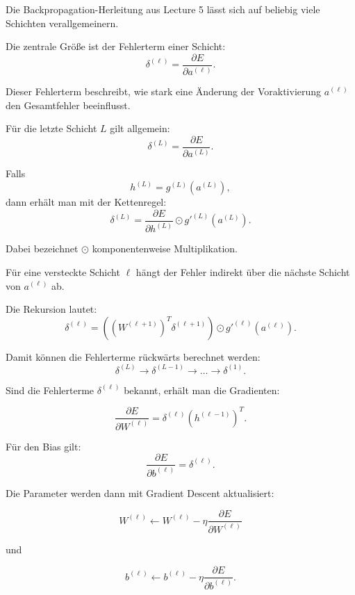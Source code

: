 \documentclass[11pt,a4paper]{scrartcl}
\begin{document}
\begin{notebox}
    Die Backpropagation-Herleitung aus Lecture 5 lässt sich auf beliebig viele
    Schichten verallgemeinern.

    Die zentrale Größe ist der Fehlerterm einer Schicht:
    \[
        \delta^{(\ell)}
        =
        \frac{\partial E}{\partial a^{(\ell)}}.
    \]

    Dieser Fehlerterm beschreibt, wie stark eine Änderung der Voraktivierung
    \(a^{(\ell)}\) den Gesamtfehler beeinflusst.
\end{notebox}

\begin{calculationbox}
    Für die letzte Schicht \(L\) gilt allgemein:
    \[
        \delta^{(L)}
        =
        \frac{\partial E}{\partial a^{(L)}}.
    \]

    Falls
    \[
        h^{(L)} = g^{(L)}(a^{(L)}),
    \]
    dann erhält man mit der Kettenregel:
    \[
        \delta^{(L)}
        =
        \frac{\partial E}{\partial h^{(L)}}
        \odot
        g'^{(L)}(a^{(L)}).
    \]

    Dabei bezeichnet \(\odot\) komponentenweise Multiplikation.
\end{calculationbox}

\begin{calculationbox}
    Für eine versteckte Schicht \(\ell\) hängt der Fehler indirekt über die
    nächste Schicht von \(a^{(\ell)}\) ab.

    Die Rekursion lautet:
    \[
        \delta^{(\ell)}
        =
        \left(
            (W^{(\ell+1)})^T
            \delta^{(\ell+1)}
        \right)
        \odot
        g'^{(\ell)}(a^{(\ell)}).
    \]

    Damit können die Fehlerterme rückwärts berechnet werden:
    \[
        \delta^{(L)}
        \longrightarrow
        \delta^{(L-1)}
        \longrightarrow
        \dots
        \longrightarrow
        \delta^{(1)}.
    \]
\end{calculationbox}

\begin{calculationbox}
    Sind die Fehlerterme \(\delta^{(\ell)}\) bekannt, erhält man die Gradienten:

    \[
        \frac{\partial E}{\partial W^{(\ell)}}
        =
        \delta^{(\ell)}
        \left(h^{(\ell-1)}\right)^T.
    \]

    Für den Bias gilt:
    \[
        \frac{\partial E}{\partial b^{(\ell)}}
        =
        \delta^{(\ell)}.
    \]

    Die Parameter werden dann mit Gradient Descent aktualisiert:

    \[
        W^{(\ell)}
        \leftarrow
        W^{(\ell)}
        -
        \eta
        \frac{\partial E}{\partial W^{(\ell)}}
    \]

    und

    \[
        b^{(\ell)}
        \leftarrow
        b^{(\ell)}
        -
        \eta
        \frac{\partial E}{\partial b^{(\ell)}}.
    \]
\end{calculationbox}
\end{document}

